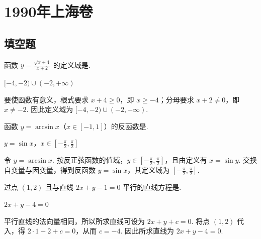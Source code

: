 \documentclass[UTF8,a4paper,oneside,11pt]{ctexbook}
\begin{document}
\mainmatter

\chapter{1990年上海卷}
\section{填空题}

\begin{problem}
函数 \(y=\frac{\sqrt{x+4}}{x+2}\) 的定义域是\fillinblank{}.
\end{problem}

\begin{answer}
\([-4,-2)\cup(-2,+\infty)\)
\end{answer}

\begin{solution}
要使函数有意义，根式要求 \(x+4\geq0\)，即 \(x\geq-4\)；分母要求 \(x+2\ne0\)，即 \(x\ne-2\). 因此定义域为 \([-4,-2)\cup(-2,+\infty)\).
\end{solution}

\begin{problem}
函数 \(y=\arcsin x\)（\(x\in[-1,1]\)）的反函数是\fillinblank{}.
\end{problem}

\begin{answer}
\(y=\sin x\)，\(x\in[-\frac{\pi}{2},\frac{\pi}{2}]\)
\end{answer}

\begin{solution}
令 \(y=\arcsin x\). 按反正弦函数的值域，\(y\in[-\frac{\pi}{2},\frac{\pi}{2}]\)，且由定义有 \(x=\sin y\). 交换自变量与因变量，得到反函数 \(y=\sin x\)，其定义域为 \([-\frac{\pi}{2},\frac{\pi}{2}]\).
\end{solution}

\begin{problem}
过点 \((1,2)\) 且与直线 \(2x+y-1=0\) 平行的直线方程是\fillinblank{}.
\end{problem}

\begin{answer}
\(2x+y-4=0\)
\end{answer}

\begin{solution}
平行直线的法向量相同，所以所求直线可设为 \(2x+y+c=0\). 将点 \((1,2)\) 代入，得 \(2\cdot1+2+c=0\)，从而 \(c=-4\). 因此所求直线为 \(2x+y-4=0\).
\end{solution}
\end{document}
